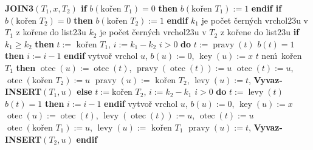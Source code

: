 \documentclass[a4paper,12pt]{article}
\DeclareMathOperator*{\otec}{otec}
\DeclareMathOperator*{\levy}{levy}
\DeclareMathOperator*{\pravy}{pravy}
\DeclareMathOperator*{\key}{key}
\begin{document}
{\bf JOIN3$(T_1,x,T_2)$\newline 
if} $b(\text{ko\v ren }T_1)=0$ {\bf then} $b(\text{ko\v ren }T_1)
:=1$ {\bf endif\newline 
if} $b(\text{ko\v ren }T_2)=0$ {\bf then} $b(\text{ko\v ren }T_2)
:=1$ {\bf endif}\newline 
$k_1$ je po\v cet \v cern\'ych vrchol\accent23u v $T_1$ z ko\v rene do list\accent23u \newline 
$k_2$ je po\v cet \v cern\'ych vrchol\accent23u v $T_2$ z ko\v rene do list\accent23u \newline 
{\bf if} $k_1\ge k_2$ {\bf then}\newline 
\phantom{---}$t:=\text{ ko\v ren }T_1$, $i:=k_1-k_2$ \newline 
\phantom{---}{\bf while} $i>0$ {\bf do}\newline 
\phantom{------}$t:=\pravy(t)$\newline 
\phantom{------}{\bf if} $b(t)=1$ {\bf then} $i:=i-1$ {\bf endif}\newline 
\phantom{---}{\bf enddo}\newline 
\phantom{---}vytvo\v r vrchol $u$, $b(u):=0$, $\key(u):=x$\newline 
\phantom{---}{\bf if} $t$ nen\'\i\ ko\v ren $T_1$ {\bf then}\newline 
\phantom{------}$\otec(u):=\otec(t)$, $\pravy(\otec(t)):=u$\newline 
\phantom{---}{\bf endif}\newline 
\phantom{---}$\otec(t):=u$, $\otec(\text{ko\v ren }T_2):=u$ \newline 
\phantom{---}$\pravy(u):=\text{ ko\v ren }T_2$, $\levy(u):=t$, {\bf Vyvaz-INSERT$(T_1,u)$\newline 
else}\newline 
\phantom{---}$t:=\text{ko\v ren }T_2$, $i:=k_2-k_1$ \newline 
\phantom{---}{\bf while} $i>0$ {\bf do}\newline 
\phantom{------}$t:=\levy(t)$\newline 
\phantom{------}{\bf if} $b(t)=1$ {\bf then} $i:=i-1$ {\bf endif}\newline 
\phantom{---}{\bf enddo}\newline 
\phantom{---}vytvo\v r vrchol $u$, $b(u):=0$, $\key(u):=x$ \newline 
\phantom{---}$\otec(u):=\otec(t)$, $\levy(\otec(t)):=u$, $\otec(t):=u$ \newline 
\phantom{---}$\otec(\text{ko\v ren }T_1):=u$, $\levy(u):=\text{ ko\v ren }T_1$ \newline 
\phantom{---}$\pravy(u):=t$, {\bf Vyvaz-INSERT}$(T_2,u)$\newline 
{\bf endif}
\medskip
\end{document}
